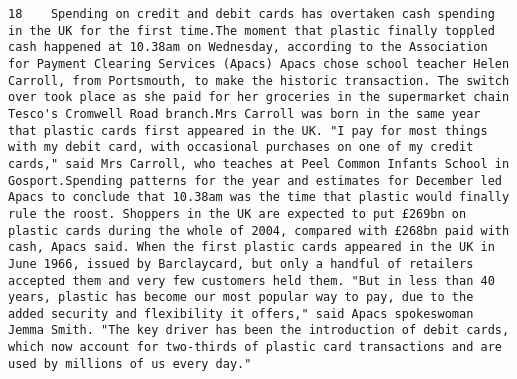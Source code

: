 \documentclass[11pt]{article}
\begin{document}
\begin{Verbatim}[commandchars=\\\{\}]
         18    Spending on credit and debit cards has overtaken cash spending in the UK for the first time.The moment that plastic finally toppled cash happened at 10.38am on Wednesday, according to the Association for Payment Clearing Services (Apacs) Apacs chose school teacher Helen Carroll, from Portsmouth, to make the historic transaction. The switch over took place as she paid for her groceries in the supermarket chain Tesco's Cromwell Road branch.Mrs Carroll was born in the same year that plastic cards first appeared in the UK. "I pay for most things with my debit card, with occasional purchases on one of my credit cards," said Mrs Carroll, who teaches at Peel Common Infants School in Gosport.Spending patterns for the year and estimates for December led Apacs to conclude that 10.38am was the time that plastic would finally rule the roost. Shoppers in the UK are expected to put £269bn on plastic cards during the whole of 2004, compared with £268bn paid with cash, Apacs said. When the first plastic cards appeared in the UK in June 1966, issued by Barclaycard, but only a handful of retailers accepted them and very few customers held them. "But in less than 40 years, plastic has become our most popular way to pay, due to the added security and flexibility it offers," said Apacs spokeswoman Jemma Smith. "The key driver has been the introduction of debit cards, which now account for two-thirds of plastic card transactions and are used by millions of us every day."                                                                                                                                                                                                                                                                                                                                                                                                                                                                                                                                                                                                                                                                                                                                                                                                                                                                                                                                                                                                                                                                                                                                                                                                                                                                                                                                                                                                                                                                                                                                                                                                                                                                                                                                                                                                                                                                                  
\end{Verbatim}
\end{document}
